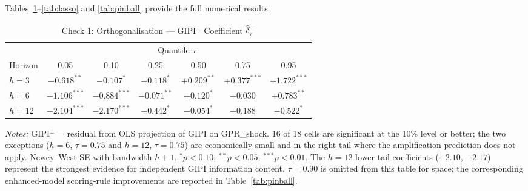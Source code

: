 \documentclass[12pt]{article}
\begin{document}
Tables~\ref{tab:orth}--\ref{tab:lasso} and \ref{tab:pinball} provide the full numerical results.

\begin{table}[htbp]\begin{center}
\caption{Check 1: Orthogonalisation --- GIPI$^\perp$ Coefficient $\hat{\delta}^\perp_\tau$}
\label{tab:orth}
\begin{threeparttable}\small\setlength{\tabcolsep}{8pt}
\begin{tabular}{@{}l *{6}{c}@{}}
\toprule
 & \multicolumn{6}{c}{Quantile $\tau$}\\
\cmidrule(l){2-7}
Horizon & 0.05 & 0.10 & 0.25 & 0.50 & 0.75 & 0.95\\
\midrule
$h=3$  & $-0.618^{**}$ & $-0.107^{*}$   & $-0.118^{*}$   & $+0.209^{**}$ & $+0.377^{***}$ & $+1.722^{***}$\\[2pt]
$h=6$  & $-1.106^{***}$ & $-0.884^{***}$ & $-0.071^{**}$ & $+0.120^{*}$  & $+0.030$       & $+0.783^{**}$\\[2pt]
$h=12$ & $-2.104^{***}$ & $-2.170^{***}$ & $+0.442^{*}$   & $-0.054^{*}$ & $+0.188$       & $-0.522^{*}$\\
\bottomrule
\end{tabular}
\begin{tablenotes}[flushleft]\footnotesize
\item \textit{Notes:} GIPI$^\perp$ = residual from OLS projection of GIPI on GPR\_shock.
16 of 18 cells are significant at the 10\% level or better;
the two exceptions ($h{=}6$, $\tau{=}0.75$ and $h{=}12$, $\tau{=}0.75$)
are economically small and in the right tail where the amplification
prediction does not apply.
Newey--West SE with bandwidth $h{+}1$.
$^{*}p<0.10$;\; $^{**}p<0.05$;\; $^{***}p<0.01$.
The $h{=}12$ lower-tail coefficients ($-2.10$, $-2.17$) represent the
strongest evidence for independent GIPI information content.
$\tau = 0.90$ is omitted from this table for space; the corresponding
enhanced-model scoring-rule improvements are reported in
Table~\ref{tab:pinball}.
\end{tablenotes}
\end{threeparttable}
\end{center}\end{table}
\end{document}
